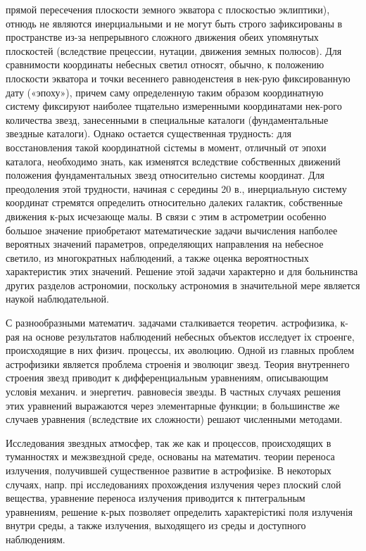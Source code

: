 \documentclass[10pt]{article}
\begin{document}
прямой пересечения плоскости земного экватора с плоскостью эклиптики), отнюдь не являются инерциальными и не могут быть строго зафиксированы в пространстве из-за непрерывного сложного движения обеих упомянутых плоскостей (вследствие прецессии, нутации, движения земных полюсов). Для сравнимости координаты небесных светил относят, обычно, к положению плоскости экватора и точки весеннего равноденстеия в нек-рую фиксированную дату («эпоху»), причем саму определенную таким образом координатную систему фиксируют наиболее тщательно измеренными координатами нек-рого количества звезд, занесенными в специальные каталоги (фундаментальные звездные каталоги). Однако остается существенная трудность: для восстановления такой координатной сістемы в момент, отличный от эпохи каталога, необходимо знать, как изменятся вследствие собственных движений положения фундаментальных звезд относительно системы координат. Для преодоления этой трудности, начиная с середины 20 в., инерциальную систему координат стремятся определить относительно далеких галактик, собственные движения к-рых исчезающе малы. В связи с этим в астрометрии особенно большое значение приобретают математические задачи вычисления напболее вероятных значений параметров, определяющих направления на небесное светило, из многократных наблюдений, а также оценка вероятностных характеристик этих значений. Решение этой задачи характерно и для больнинства других разделов астрономии, поскольку астрономия в значительной мере является наукой наблюдательной.



С разнообразными математич. задачами сталкивается теоретич. астрофизика, к-рая на основе результатов наблюдений небесных объектов исследует іх строенге, происходящие в них физич. процессы, их әволюцию. Одной из главных проблем астрофизики является проблема строенія и эволюциг звезд. Теория внутреннего строения звезд приводит к дифференциальным уравнениям, описывающим условія механич. и энергетич. равновесія звезды. В частных случаях решения этих уравнений выражаются через элементарные функции; в большинстве же случаев уравнения (вследствие их сложности) решают численными методами.



Исследования звездных атмосфер, так же как и процессов, происходящих в туманностях и межзвездной среде, основаны на математич. теории переноса излучения, получившей существенное развитие в астрофизіке. В некоторых случаях, напр. прі исследованиях прохождения излучения через плоский слой вещества, уравнение переноса излучения приводится к пнтегральным уравнениям, решение к-рых позволяет определить характерістикі поля излученія внутри среды, а также излучения, выходящего из среды и доступного наблюдениям.
\end{document}
